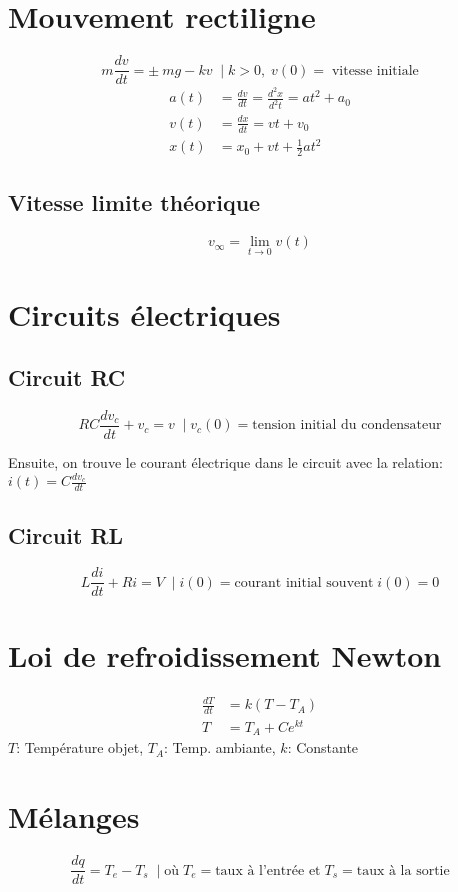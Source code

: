 

\section{Mouvement rectiligne}
\vspace{-2\baselineskip}
\begin{equation*}
m\frac{dv}{dt}=\pm \:mg-kv \;\mid k>0,\;v(0)=\;\textrm{vitesse initiale}
\end{equation*}
\begin{align*}
    a(t) &= \frac{dv}{dt} = \frac{d^2x}{d^2t} = at^2 +a_0\\
    v(t) &= \frac{dx}{dt} = vt+v_0\\
    x(t) &= x_0 + v t + \frac{1}{2}a t^2
\end{align*}

\subsection{Vitesse limite théorique}
\begin{equation*}
v_\infty = \lim_{t\rightarrow 0} v(t)
\end{equation*}

\section{Circuits électriques}
\vspace{-2\baselineskip}
\subsection{Circuit RC}
\[RC\frac{dv_c}{dt}+v_c = v \;\mid v_c(0) = \textrm{tension initial du condensateur}\]

Ensuite, on trouve le courant électrique dans le circuit avec la relation:
\(i(t)=C\frac{dv_c}{dt}\)


\subsection{Circuit RL}
\[L\frac{di}{dt}+Ri=V \;\mid i(0) = \textrm{courant initial souvent}\; i(0)=0\]

\section{Loi de refroidissement Newton}
\vspace{-2\baselineskip} 
\begin{align*}
    \frac{dT}{dt} &= k(T-T_A) \\
    T &= T_A + Ce^{kt}    
\end{align*}
$T$: Température objet, $T_A$: Temp. ambiante, $k$: Constante



\section{Mélanges}
\vspace{-2\baselineskip}
\[ \frac{dq}{dt}=T_e - T_s \;\mid \textrm{où}\; T_e = \textrm{taux à l'entrée et}\; T_s = \textrm{taux à la sortie}\]
